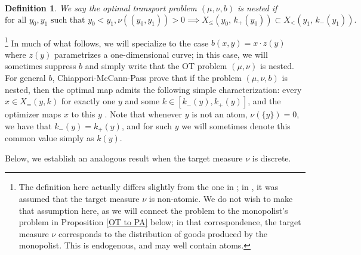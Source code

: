 \documentclass[12pt,reqno]{amsart}
\newtheorem{definition}{Definition}
\begin{document}



\begin{definition}\label{nested}
    We say the optimal transport problem $(\mu,\nu,b)$ is nested if
    \[\text{for all } y_0,y_1 \text{ such that } y_0<y_1, \nu((y_0,y_1))>0\implies X_{\le}(y_0,\,k_+(y_0))\subset X_{<}(y_1,\,k_-(y_1)).\] 
\end{definition}\footnote{ The definition here actually differs slightly from the one in \cite{ChiapporiMcCannPass17}; in \cite{ChiapporiMcCannPass17}, it was assumed that the target measure $\nu$ is non-atomic.  We do not wish to make that assumption here, as we will connect the problem to the monopolist's problem in Proposition \ref{OT to PA} below; in that correspondence, the target measure $\nu$ corresponds to the distribution of goods produced by the monopolist.  This is endogenous, and may well contain atoms.}
In much of what follows, we will specialize to the case $b(x,y)=x\cdot z(y)$ where $z(y)$ parametrizes a one-dimensional curve; in this case, we will sometimes suppress $b$ and simply write that the OT problem $(\mu,\nu)$ is nested.   For general $b$, Chiappori-McCann-Pass prove that if the problem $(\mu,\nu,b)$ is nested, then the optimal map admits the following simple characterization: every $x \in X_=(y,k)$ for exactly one $y$ and some $k \in [k_-(y),k_+(y)]$, and the optimizer maps $x$ to this $y$ \cite{ChiapporiMcCannPass17}. Note that whenever $y$ is not an atom, $\nu(\{y\})=0$, we have that $k_-(y)=k_+(y)$, and for such $y$ we will sometimes denote this common value simply as $k(y)$.

Below, we establish an analogous result when the target measure $\nu$ is discrete.
\end{document}
